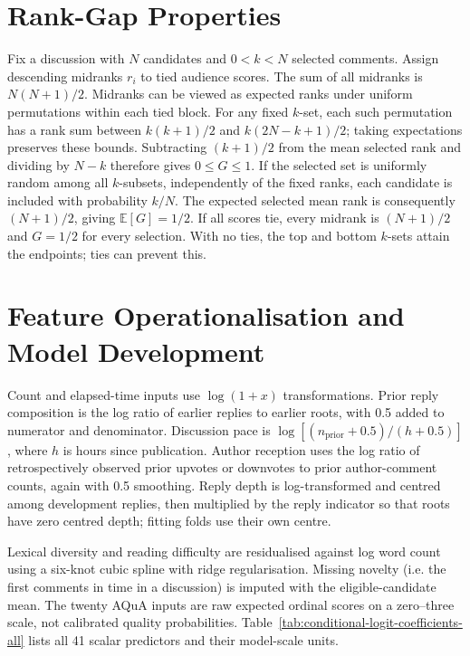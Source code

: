 \setcounter{secnumdepth}{1} %

\section{Rank-Gap Properties}
\label{app:gap-properties}
Fix a discussion with $N$ candidates and $0<k<N$ selected comments. Assign descending midranks $r_i$ to tied audience scores. The sum of all midranks is $N(N+1)/2$. Midranks can be viewed as expected ranks under uniform permutations within each tied block. For any fixed $k$-set, each such permutation has a rank sum between $k(k+1)/2$ and $k(2N-k+1)/2$; taking expectations preserves these bounds. Subtracting $(k+1)/2$ from the mean selected rank and dividing by $N-k$ therefore gives $0\leq G\leq1$. If the selected set is uniformly random among all $k$-subsets, independently of the fixed ranks, each candidate is included with probability $k/N$. The expected selected mean rank is consequently $(N+1)/2$, giving $\mathbb{E}[G]=1/2$. If all scores tie, every midrank is $(N+1)/2$ and $G=1/2$ for every selection. With no ties, the top and bottom $k$-sets attain the endpoints; ties can prevent this.

\section{Feature Operationalisation and Model Development}
\label{app:feature-operationalisation}
Count and elapsed-time inputs use $\log(1+x)$ transformations. Prior reply composition is the log ratio of earlier replies to earlier roots, with 0.5 added to numerator and denominator. Discussion pace is $\log[(n_{\mathrm{prior}}+0.5)/(h+0.5)]$, where $h$ is hours since publication. Author reception uses the log ratio of retrospectively observed prior upvotes or downvotes to prior author-comment counts, again with 0.5 smoothing. Reply depth is log-transformed and centred among development replies, then multiplied by the reply indicator so that roots have zero centred depth; fitting folds use their own centre.

Lexical diversity and reading difficulty are residualised against log word count using a six-knot cubic spline with ridge regularisation. Missing novelty (i.e. the first comments in time in a discussion) is imputed with the eligible-candidate mean. The twenty AQuA inputs are raw expected ordinal scores on a zero--three scale, not calibrated quality probabilities. Table~\ref{tab:conditional-logit-coefficients-all} lists all 41 scalar predictors and their model-scale units.

